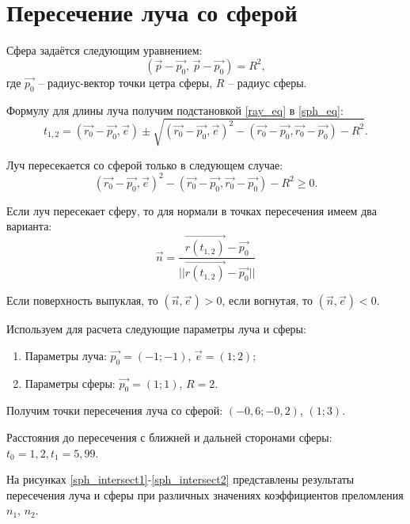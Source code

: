 \newpage

\section{Пересечение луча со сферой}
{
	Сфера задаётся следующим уравнением:
	\begin{equation}\label{sph_eq}
		(\vec{p} - \vec{p_0},\, \vec{p} - \vec{p_0}) = R^2,
	\end{equation}
	где $\vec{p_0}$ -- радиус-вектор точки цетра сферы, 
	\newline $R$ -- радиус сферы.
	
	Формулу для длины луча получим подстановкой \eqref{ray_eq} в \eqref{sph_eq}:
	\begin{equation}\label{ray_sphere_intersect}
	t_{1,2} = (\vec{r_0} - \vec{p_0}, \vec{e}) \pm \sqrt{(\vec{r_0} - \vec{p_0}, \vec{e})^2 - (\vec{r_0} - \vec{p_0}, \vec{r_0} - \vec{p_0}) - R^2}.
	\end{equation}
	
	Луч пересекается со сферой только в следующем случае:
	\begin{equation}\label{sph_intersect_criteria}
	(\vec{r_0} - \vec{p_0}, \vec{e})^2 - (\vec{r_0} - \vec{p_0}, \vec{r_0} - \vec{p_0}) - R^2 \geq 0.
	\end{equation}
	
	Если луч пересекает сферу, то для нормали в точках пересечения имеем два варианта:
	\begin{equation}\label{sph_normal}
	\vec{n} = \frac{\vec{r(t_{1,2})} - \vec{p_0}}{||\vec{r(t_{1,2})} - \vec{p_0}||}
	\end{equation}
	
	Если поверхность выпуклая, то $(\vec{n}, \vec{e}) > 0$, если вогнутая, то $(\vec{n}, \vec{e}) < 0$.
	
	Используем для расчета следующие параметры луча и сферы:
	\begin{enumerate}
	\item Параметры луча: $\vec{p_0} = (-1; -1)$, $\vec{e} = (1; 2)$;
	\item Параметры сферы: $\vec{p_0} = (1; 1)$, $R = 2$.
	\end{enumerate}
	
	Получим точки пересечения луча со сферой: $(-0,6; -0,2)$, $(1; 3)$.
	
	Расстояния до пересечения с ближней и дальней сторонами сферы: ${t_0 = 1,2, t_1 = 5,99}$.
	
	На рисунках \ref{sph_intersect1}-\ref{sph_intersect2} представлены результаты пересечения луча и сферы при различных значениях коэффициентов преломления $n_1$, $n_2$.
	
}
